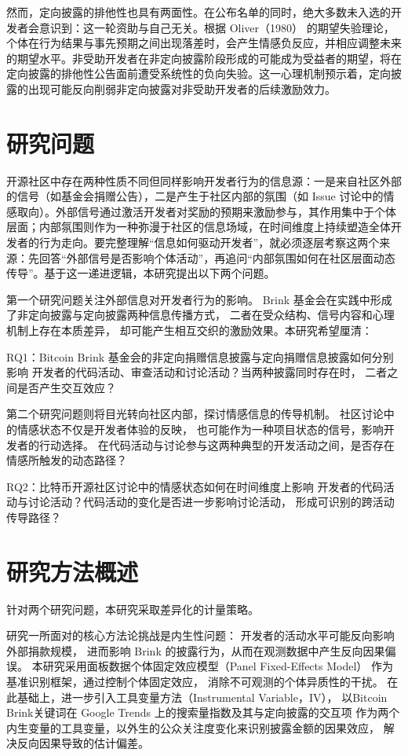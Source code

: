\documentclass[
    type = master, %
    degree = professional,        %
    decl-page,  %
    twoside,                %
    fontset = fandol %
  ]{njuthesis}
\begin{document}
然而，定向披露的排他性也具有两面性。在公布名单的同时，绝大多数未入选的开发者会意识到：这一轮资助与自己无关。根据 Oliver（1980）\cite{oliver1980cognitive} 的期望失验理论，个体在行为结果与事先预期之间出现落差时，会产生情感负反应，并相应调整未来的期望水平。非受助开发者在非定向披露阶段形成的可能成为受益者的期望，将在定向披露的排他性公告面前遭受系统性的负向失验。这一心理机制预示着，定向披露的出现可能反向削弱非定向披露对非受助开发者的后续激励效力。

\section{研究问题}

开源社区中存在两种性质不同但同样影响开发者行为的信息源：一是来自社区外部的信号（如基金会捐赠公告），二是产生于社区内部的氛围（如 Issue 讨论中的情感取向）。外部信号通过激活开发者对奖励的预期来激励参与，其作用集中于个体层面；内部氛围则作为一种弥漫于社区的信息场域，在时间维度上持续塑造全体开发者的行为走向。要完整理解“信息如何驱动开发者”，就必须逐层考察这两个来源：先回答“外部信号是否影响个体活动”，再追问“内部氛围如何在社区层面动态传导”。基于这一递进逻辑，本研究提出以下两个问题。

第一个研究问题关注外部信息对开发者行为的影响。
Brink 基金会在实践中形成了非定向披露与定向披露两种信息传播方式，
二者在受众结构、信号内容和心理机制上存在本质差异，
却可能产生相互交织的激励效果。本研究希望厘清：

RQ1：Bitcoin Brink 基金会的非定向捐赠信息披露与定向捐赠信息披露如何分别影响
开发者的代码活动、审查活动和讨论活动？当两种披露同时存在时，
二者之间是否产生交互效应？

第二个研究问题则将目光转向社区内部，探讨情感信息的传导机制。
社区讨论中的情感状态不仅是开发者体验的反映，
也可能作为一种项目状态的信号，影响开发者的行动选择。
在代码活动与讨论参与这两种典型的开发活动之间，是否存在情感所触发的动态路径？

RQ2：比特币开源社区讨论中的情感状态如何在时间维度上影响
开发者的代码活动与讨论活动？代码活动的变化是否进一步影响讨论活动，
形成可识别的跨活动传导路径？


\section{研究方法概述}

针对两个研究问题，本研究采取差异化的计量策略。

研究一所面对的核心方法论挑战是内生性问题：
开发者的活动水平可能反向影响外部捐款规模，
进而影响 Brink 的披露行为，从而在观测数据中产生反向因果偏误。
本研究采用面板数据个体固定效应模型（Panel Fixed-Effects Model）
作为基准识别框架，通过控制个体固定效应，
消除不可观测的个体异质性的干扰。
在此基础上，进一步引入工具变量方法（Instrumental Variable，IV），
以Bitcoin Brink关键词在 Google Trends 上的搜索量指数及其与定向披露的交互项
作为两个内生变量的工具变量，以外生的公众关注度变化来识别披露金额的因果效应，
解决反向因果导致的估计偏差。
\end{document}
